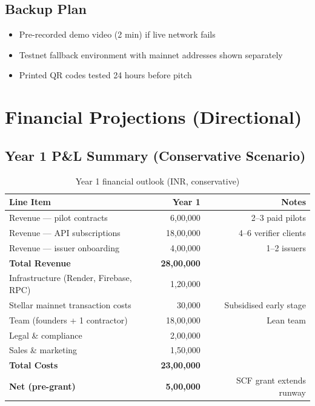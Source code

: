 \documentclass[11pt,a4paper]{article}
\newcommand{\stellar}{\textsf{Stellar}}
\begin{document}
\subsection{Backup Plan}

\begin{itemize}
  \item Pre-recorded demo video (2 min) if live network fails
  \item Testnet fallback environment with mainnet addresses shown separately
  \item Printed QR codes tested 24 hours before pitch
\end{itemize}

\section{Financial Projections (Directional)}

\subsection{Year 1 P\&L Summary (Conservative Scenario)}

\begin{table}[H]
  \centering
  \caption{Year 1 financial outlook (INR, conservative)}
  \renewcommand{\arraystretch}{1.2}
  \begin{tabular}{@{}lrr@{}}
    \toprule
    \textbf{Line Item} & \textbf{Year 1} & \textbf{Notes} \\
    \midrule
    Revenue --- pilot contracts & 6,00,000 & 2--3 paid pilots \\
    Revenue --- API subscriptions & 18,00,000 & 4--6 verifier clients \\
    Revenue --- issuer onboarding & 4,00,000 & 1--2 issuers \\
    \midrule
    \textbf{Total Revenue} & \textbf{28,00,000} & \\
    \midrule
    Infrastructure (Render, Firebase, RPC) & 1,20,000 & \\
    \stellar{} mainnet transaction costs & 30,000 & Subsidised early stage \\
    Team (founders + 1 contractor) & 18,00,000 & Lean team \\
    Legal \& compliance & 2,00,000 & \\
    Sales \& marketing & 1,50,000 & \\
    \midrule
    \textbf{Total Costs} & \textbf{23,00,000} & \\
    \midrule
    \textbf{Net (pre-grant)} & \textbf{5,00,000} & SCF grant extends runway \\
    \bottomrule
  \end{tabular}
\end{table}
\end{document}
